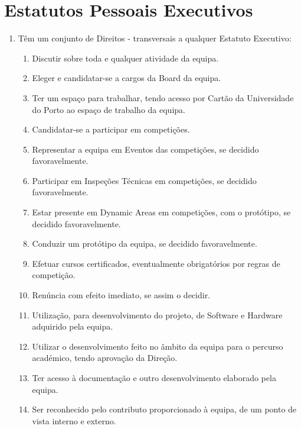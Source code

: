 \section{Estatutos Pessoais Executivos}
\begin{enumerate}
  \item Têm um conjunto de Direitos - transversais a qualquer Estatuto Executivo:
  \begin{enumerate}
    \item Discutir sobre toda e qualquer atividade da equipa.
    \item Eleger e candidatar-se a cargos da Board da equipa.
    \item Ter um espaço para trabalhar, tendo acesso por Cartão da Universidade do Porto ao espaço de trabalho da equipa.
    \item Candidatar-se a participar em competições.
    \item Representar a equipa em Eventos das competições, se decidido favoravelmente.
    \item Participar em Inspeções Técnicas em competições, se decidido favoravelmente.
    \item Estar presente em Dynamic Areas em competições, com o protótipo, se decidido favoravelmente.
    \item Conduzir um protótipo da equipa, se decidido favoravelmente.
    \item Efetuar cursos certificados, eventualmente obrigatórios por regras de competição.
    \item Renúncia com efeito imediato, se assim o decidir.
    \item Utilização, para desenvolvimento do projeto, de Software e Hardware adquirido pela equipa.
    \item Utilizar o desenvolvimento feito no âmbito da equipa para o percurso académico, tendo aprovação da Direção.
    \item Ter acesso à documentação e outro desenvolvimento elaborado pela equipa.
    \item Ser reconhecido pelo contributo proporcionado à equipa, de um ponto de vista interno e externo.
  \end{enumerate}


\end{enumerate}

